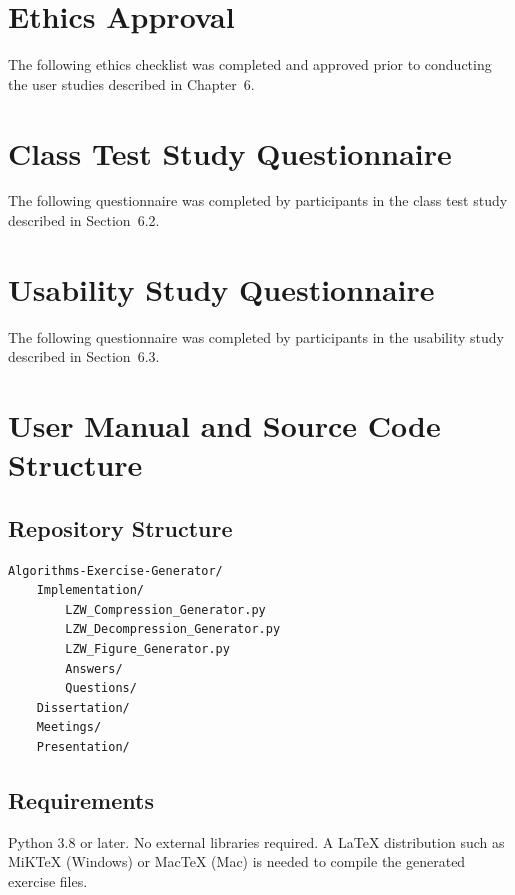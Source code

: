 \documentclass{l4proj}
\begin{document}
\begin{appendices}

\chapter{Ethics Approval}

The following ethics checklist was completed and approved prior to conducting the user studies described in Chapter~6.



\chapter{Class Test Study Questionnaire}

The following questionnaire was completed by participants in the class test study described in Section~6.2.



\chapter{Usability Study Questionnaire}

The following questionnaire was completed by participants in the usability study described in Section~6.3.




\chapter{User Manual and Source Code Structure}

\section*{Repository Structure}
\begin{verbatim}
Algorithms-Exercise-Generator/
    Implementation/
        LZW_Compression_Generator.py
        LZW_Decompression_Generator.py
        LZW_Figure_Generator.py
        Answers/
        Questions/
    Dissertation/
    Meetings/
    Presentation/
\end{verbatim}

\section*{Requirements}
Python 3.8 or later. No external libraries required. A LaTeX distribution such as MiKTeX (Windows) or MacTeX (Mac) is needed to compile the generated exercise files.


\end{appendices}
\end{document}
